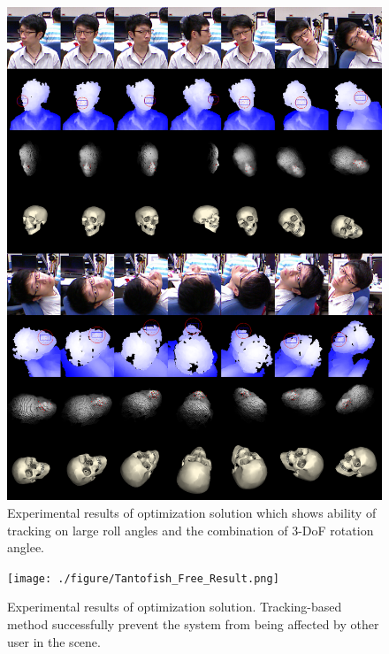 \begin{figure}
\includegraphics[width=1.0\linewidth]{./figure/Tantofish_Roll_Result.png}
\caption{Experimental results of optimization solution which shows ability of tracking on large roll angles and the combination of 3-DoF rotation anglee.}
\label{f:m2 result tantofish 2}       %
\end{figure}

\begin{figure}
\texttt{[image: ./figure/Tantofish\_Free\_Result.png]}
\caption{Experimental results of optimization solution. Tracking-based method successfully prevent the system from being affected by other user in the scene.}
\label{f:m2 result tantofish 3}       %
\end{figure}


